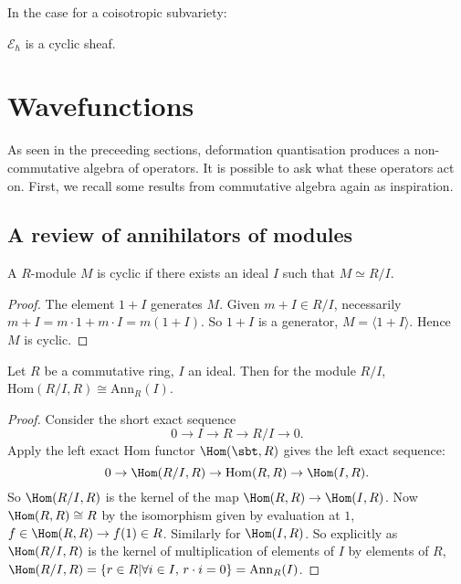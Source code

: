     In the case for a coisotropic subvariety: 

    \begin{prop} 
    \( \mathcal{E}_{\hslash}\) is a cyclic sheaf.
    \end{prop} 
    
    
    

    \section{Wavefunctions}
    As seen in the preceeding sections, deformation quantisation produces a non-commutative algebra of operators. It is possible to ask what these operators act on. First, we recall some results from commutative algebra again as inspiration.

    \subsection{A review of annihilators of modules}
    
    \begin{lem} A \(R\)-module \(M\) is cyclic if there exists an ideal \(I\) such that \( M\simeq R/I \).
    \end{lem}
    \begin{proof}
    The element \(1 + I\) generates \(M\). Given \( m + I \in R/I\), necessarily \( m + I = m \cdot 1 + m \cdot I = m ( 1 +  I)\). So \(1 + I\) is a generator, \(M = \langle 1 + I \rangle \). Hence \(M\) is cyclic.
    \end{proof}

    \begin{lem} Let \(R\) be a commutative ring, \(I\) an ideal. Then for the module \(R/I\), \( \mathrm{Hom}(R/I,R) \cong  \mathrm{Ann}_R(I)\).
    \end{lem} 
    
    \begin{proof}
       Consider the short exact sequence
       \[ 0 \rightarrow I \rightarrow R \rightarrow R/I \rightarrow 0. \]
       Apply the left exact Hom functor \(\Hom(\sbt,R)\) gives the left exact sequence:
       \[ 0 \rightarrow \Hom(R/I,R) \rightarrow \mathrm{Hom}(R,R) \rightarrow \Hom(I,R). \]
       So \( \Hom(R/I,R)\) is the kernel of the map \( \Hom(R,R) \rightarrow \Hom(I,R)\). Now \( \Hom(R,R) \cong R\) by the isomorphism given by evaluation at \(1\), \( f \in \Hom(R,R) \rightarrow f(1) \in R\). Similarly for \(\Hom(I,R)\). So explicitly as \(\Hom(R/I,R)\) is the kernel of multiplication of elements of \(I\) by elements of \(R\), \( \Hom(R/I,R) = \{ r \in R | \forall i \in I, \,r \cdot i = 0 \} = \mathrm{Ann}_R(I)\).
    \end{proof}
    
